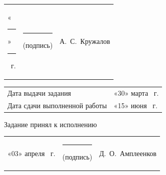 \documentclass[14pt, a4paper]{extarticle}
\begin{document}
{
\renewcommand{\arraystretch}{2}
\noindent
\begin{tabularx}{\textwidth}{@{} P{0.38\textwidth} P{0.27\textwidth} P{0.35\textwidth} @{}}

    «\rule{0.8cm}{0.4pt}» \quad \rule{2cm}{0.4pt} ~г. &
    \centering \rule{3.5cm}{0.4pt} \par \footnotesize (подпись) &
    \hfill А.~С.~Кружалов                                         \\
\end{tabularx}

\begin{tabularx}{\textwidth}{@{} P{0.45\textwidth} P{0.55\textwidth} @{}}
    Дата выдачи задания           &
    \hfill «30» \quad марта ~г. \\

    Дата сдачи выполненной работы &
    \hfill «15» \quad июня ~г. \\
\end{tabularx}
}

\begin{minipage}{\textwidth}
Задание принял к исполнению\vspace{0.1cm}

{
\renewcommand{\arraystretch}{1.1}
\begin{tabularx}{\textwidth}{@{} P{0.38\textwidth} P{0.27\textwidth} P{0.35\textwidth} @{}}
    «03» \quad апреля ~г. &
    \centering \rule{3.5cm}{0.4pt} \par \footnotesize (подпись) &
    \hfill Д.~О.~Амплеенков                                      \\
\end{tabularx}
}
\end{minipage}
\end{document}

